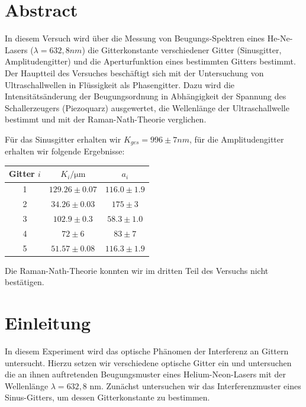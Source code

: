 \documentclass[12pt]{article}
\title{\vspace{0cm}{\Huge Fortgeschrittenen-Praktikum I:\\ \vspace{1cm} Ultraschall}}
\author{Saskia Bondza\\Simon Stephan}
\date{durchgeführt am 20./21.09.2016}
\begin{document}
\maketitle
\newpage

\thispagestyle{empty}
\section*{Abstract}


In diesem Versuch wird über die Messung von Beugungs-Spektren eines He-Ne-Lasers ($\lambda = 632,8nm$) die Gitterkonstante verschiedener Gitter (Sinusgitter, Amplitudengitter) und die Aperturfunktion eines bestimmten Gitters bestimmt. Der Hauptteil des Versuches beschäftigt sich mit der Untersuchung von Ultraschallwellen in Flüssigkeit als Phasengitter. Dazu wird die Intensitätsänderung der Beugungsordnung in Abhängigkeit der Spannung des Schallerzeugers (Piezoquarz) ausgewertet, die Wellenlänge der Ultraschallwelle bestimmt und mit der Raman-Nath-Theorie verglichen.

Für das Sinusgitter erhalten wir $K_{ges} = 996 \pm 7 nm$, für die Amplitudengitter erhalten wir folgende Ergebnisse:

\begin{table}[h!]
	\centering
	\begin{tabular}{c|c|c}
		Gitter $i$&$K_i / \mathrm{\mu m}$&$a_i$\\\hline
		1&$129.26\pm0.07$&$116.0\pm1.9$\\
		2&$ 34.26\pm0.03$&$175  \pm3  $\\
		3&$102.9 \pm0.3 $&$ 58.3\pm1.0$\\
		4&$ 72   \pm6   $&$ 83  \pm7  $\\
		5&$ 51.57\pm0.08$&$116.3\pm1.9$		
	\end{tabular}
\end{table}

Die Raman-Nath-Theorie konnten wir im dritten Teil des Versuchs nicht bestätigen.


\newpage
\tableofcontents
\newpage

\section{Einleitung}

In diesem Experiment wird das optische Phänomen der Interferenz an Gittern untersucht. Hierzu setzen wir verschiedene optische Gitter ein und untersuchen die an ihnen auftretenden Beugungsmuster eines Helium-Neon-Lasers mit der Wellenlänge $\lambda = 632,8$ nm. Zunächst untersuchen wir das Interferenzmuster eines Sinus-Gitters, um dessen Gitterkonstante zu bestimmen.\\ 
\end{document}

